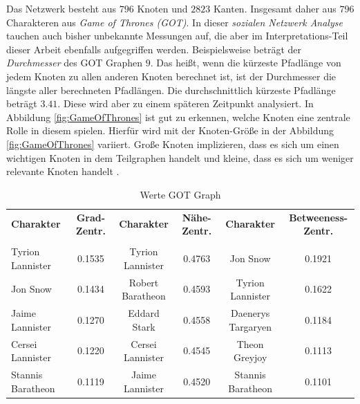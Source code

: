 Das Netzwerk besteht aus $796$ Knoten und $2823$ Kanten. Insgesamt daher aus $796$ Charakteren aus \textit{Game of Thrones (GOT)}.
In dieser \textit{sozialen Netzwerk Analyse} tauchen auch bisher unbekannte Messungen auf, die aber im Interpretations-Teil dieser Arbeit ebenfalls aufgegriffen werden. Beispielsweise beträgt der \textit{Durchmesser} des GOT Graphen $9$. Das heißt, wenn die kürzeste Pfadlänge von jedem Knoten zu allen anderen Knoten berechnet ist, ist der Durchmesser die längste aller berechneten Pfadlängen. Die durchschnittlich kürzeste Pfadlänge beträgt $3.41$. Diese wird aber zu einem späteren Zeitpunkt analysiert. In Abbildung \ref{fig:GameOfThrones} ist gut zu erkennen, welche Knoten eine zentrale Rolle in diesem spielen. Hierfür wird mit der Knoten-Größe in der Abbildung \ref{fig:GameOfThrones} variiert. Große Knoten implizieren, dass es sich um einen wichtigen Knoten in dem Teilgraphen handelt und kleine, dass es sich um weniger relevante Knoten handelt \cite{GOT}. 
\begin{table}[h!]
\footnotesize
\caption{Werte GOT Graph}
\label{TableGOT}
\begin{tabular}{lccccc}\toprule 
\textbf{Charakter} &\textbf{Grad-Zentr.} & \textbf{Charakter} &\textbf{Nähe-Zentr.}  & \textbf{Charakter} &\textbf{Betweeness-Zentr.} \\
 &\\\midrule
  Tyrion Lannister & 0.1535  & Tyrion Lannister & 0.4763 & Jon Snow& 0.1921   \\\midrule
  Jon Snow & 0.1434 & Robert Baratheon & 0.4593 & Tyrion Lannister & 0.1622   \\\midrule
  Jaime Lannister & 0.1270  & Eddard Stark& 0.4558& Daenerys Targaryen & 0.1184   \\\midrule
  Cersei Lannister & 0.1220 & Cersei Lannister & 0.4545 & Theon Greyjoy & 0.1113   \\\midrule
  Stannis Baratheon & 0.1119 & Jaime Lannister & 0.4520 & Stannis Baratheon & 0.1101 
       
  \\\bottomrule
 \end{tabular}
 \end{table}
